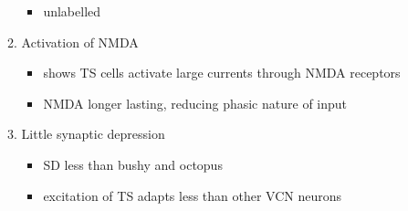 \begin{enumerate}
\begin{enumerate}
\begin{itemize}
\item unlabelled \citep{RothmanManis:2003,RothmanManis:2003a,RothmanManis:2003b,Rothman:1999}
\end{itemize}
\item Activation of NMDA
\begin{itemize}
\item \citep{CaoOertel:2010} shows TS cells activate large currents through NMDA receptors
\item NMDA longer lasting, reducing phasic nature of input
\end{itemize}
\item Little synaptic depression
\begin{itemize}
\item SD less than bushy and octopus \citep{WuOertel:1987,ChandaXu-Friedman:2010,CaoOertel:2010}
\item excitation of TS adapts less than other VCN neurons
\end{itemize}
\end{enumerate}
\end{enumerate}







